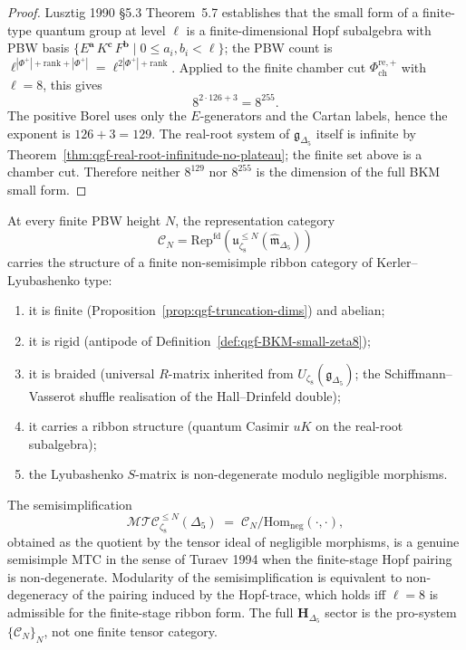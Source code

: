 \begin{proof}
Lusztig 1990 \S5.3 Theorem~5.7 establishes that the small form of a
finite-type quantum group at level $\ell$ is a finite-dimensional Hopf
subalgebra with PBW basis
$\{E^{\mathbf a}\, K^{\mathbf c}\, F^{\mathbf b}\mid 0\leq a_i, b_i < \ell\}$;
the PBW count is $\ell^{|\Phi^+|+\mathrm{rank}+|\Phi^+|}
= \ell^{2|\Phi^+|+\mathrm{rank}}$. Applied to the finite chamber cut
\(\Phi^{\mathrm{re},+}_{\mathrm{ch}}\) with \(\ell=8\), this gives
\[
 8^{2\cdot 126+3}=8^{255}.
\]
The positive Borel uses only the \(E\)-generators and the Cartan
labels, hence the exponent is \(126+3=129\). The real-root system of
\(\mathfrak g_{\Delta_5}\) itself is infinite by
Theorem~\ref{thm:qgf-real-root-infinitude-no-plateau}; the finite set
above is a chamber cut. Therefore neither \(8^{129}\) nor \(8^{255}\)
is the dimension of the full BKM small form.
\end{proof}

\begin{theorem}
\label{thm:qgf-BKM-MTC-zeta8}
At every finite PBW height \(N\), the representation category
\[
 \mathcal C_N =
 \mathrm{Rep}^{\mathrm{fd}}(\mathfrak u_{\zeta_8}^{\leq N}
 (\widehat{\mathfrak m}_{\Delta_5}))
\]
carries the structure of a finite non-semisimple ribbon category of
Kerler--Lyubashenko type:
\begin{enumerate}[label=(\roman*)]
 \item it is finite (Proposition~\ref{prop:qgf-truncation-dims})
 and abelian;
 \item it is rigid (antipode of Definition~\ref{def:qgf-BKM-small-zeta8});
 \item it is braided (universal $R$-matrix inherited from
 $U_{\zeta_8}(\mathfrak g_{\Delta_5})$; the Schiffmann--Vasserot
 shuffle realisation of the Hall--Drinfeld double);
 \item it carries a ribbon structure (quantum Casimir $u K$ on the
 real-root subalgebra);
 \item the Lyubashenko $S$-matrix is non-degenerate modulo negligible
 morphisms.
\end{enumerate}
The semisimplification
\[
 \mathcal{MTC}_{\zeta_8}^{\leq N}(\Delta_5)
 \;=\;
 \mathcal C_N\big/
 \mathrm{Hom}_{\mathrm{neg}}(\cdot,\cdot),
\]
obtained as the quotient by the tensor ideal of negligible morphisms,
is a genuine semisimple MTC in the sense of Turaev 1994 when the
finite-stage Hopf pairing is non-degenerate. Modularity
of the semisimplification is equivalent to non-degeneracy of the
pairing induced by the Hopf-trace, which holds iff $\ell = 8$ is
admissible for the finite-stage ribbon form. The full
\(\mathbf H_{\Delta_5}\) sector is the pro-system
\(\{\mathcal C_N\}_N\), not one finite tensor category.
\end{theorem}

